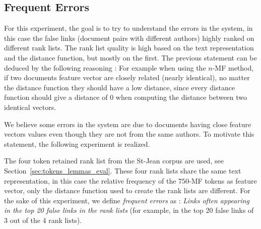 \begin{table}
  \vspace{0.5cm}

  \label{tab:gain_750_mf}
\end{table}

\subsection{Frequent Errors \label{sec:frequent_errors}}

For this experiment, the goal is to try to understand the errors in the system, in this case the false links (document pairs with different authors) highly ranked on different rank lists.
The rank list quality is high based on the text representation and the distance function, but mostly on the first.
The previous statement can be deduced by the following reasoning : For example when using the $n$-MF method, if two documents feature vector are closely related (nearly identical), no matter the distance function they should have a low distance, since every distance function should give a distance of 0 when computing the distance between two identical vectors.

We believe some errors in the system are due to documents having close feature vectors values even though they are not from the same authors.
To motivate this statement, the following experiment is realized.

The four token retained rank list from the St-Jean corpus are used, see Section~\ref{sec:tokens_lemmas_eval}.
These four rank lists share the same text representation, in this case the relative frequency of the $750$-MF tokens as feature vector, only the distance function used to create the rank lists are different.
For the sake of this experiment, we define \textit{frequent errors} as : \textit{Links often appearing in the top 20 false links in the rank lists} (for example, in the top 20 false links of 3 out of the 4 rank lists).


